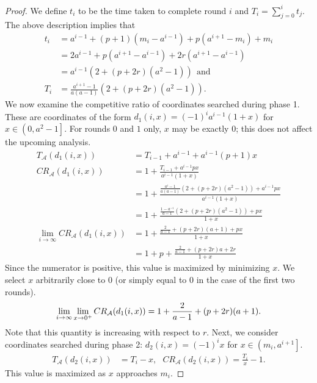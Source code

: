 \begin{proof}
  We define $t_i$ to be the time taken to complete round $i$ and $T_i = \sum_{j=0}^{i}t_j$. The above description implies that
  \begin{align*}
    t_i &= a^{i-1} + (p+1)(m_i-a^{i-1}) + p(a^{i+1}-m_i) + m_i\\
    &= 2a^{i-1} + p\left(a^{i+1}-a^{i-1}\right) + 2r\left(a^{i+1}-a^{i-1}\right)\\
    &= a^{i-1}\left(2 + (p+2r)\left(a^2-1\right)\right)~~ \text{and} \\
    T_i &= \frac{a^{i+1}-1}{a(a-1)}\left(2 + (p+2r)\left(a^2-1\right)\right) .
  \end{align*}
  We now examine the competitive ratio of coordinates searched during phase 1. These are coordinates of the form $d_1(i,x) = (-1)^ia^{i-1}(1+x)$ for $x\in\left(0,a^2-1\right]$. For rounds $0$ and $1$ only, $x$ may be exactly $0$; this does not affect the upcoming analysis.
  \begin{align*}
    T_{\mathcal{A}}(d_1(i,x)) &= T_{i-1} + a^{i-1} + a^{i-1}(p+1)x \\
    CR_{\mathcal{A}}(d_1(i,x)) &= 1 + \frac{T_{i-1} + a^{i-1}px}{a^{i-1}(1+x)} \\
    &= 1 + \frac{\frac{a^i-1}{a(a-1)}\left(2 + (p+2r)\left(a^2-1\right)\right) + a^{i-1}px}{a^{i-1}(1+x)} \\
    &= 1 + \frac{\frac{1-a^{-i}}{a-1}\left(2 + (p+2r)\left(a^2-1\right)\right) + px}{1+x} \\
    \lim_{i\to \infty}CR_{\mathcal{A}}(d_1(i,x)) &= 1 + \frac{\frac{2}{a-1} + (p+2r)(a+1) + px}{1+x}  \\
    &= 1+p + \frac{\frac{2}{a-1} + (p+2r)a + 2r}{1+x}
  \end{align*}
  Since the numerator is positive, this value is maximized by minimizing $x$. We select $x$ arbitrarily close to $0$ (or simply equal to $0$ in the case of the first two rounds). 
  \begin{equation}
    \lim_{i\to \infty}\lim_{x\to 0^+}CR_{\mathcal{A}}(d_1(i,x)) = 1 + \frac{2}{a-1} + (p+2r)(a+1) . \mylabel{eq:upbound_cr1}
  \end{equation}
  Note that this quantity is increasing with respect to $r$.
  Next, we consider coordinates searched during phase 2: $d_2(i,x) = (-1)^ix$ for $x\in\left(m_i,a^{i+1}\right]$.
  \begin{align*}
    T_{\mathcal{A}}(d_2(i,x)) &= T_{i} - x, ~~~
    CR_{\mathcal{A}}(d_2(i,x)) = \frac{T_{i}}{x} - 1 .
  \end{align*}
  This value is maximized as $x$ approaches $m_i$.

\end{proof}

